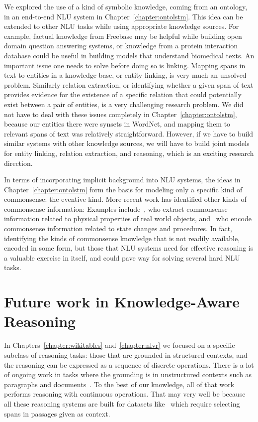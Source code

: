 We explored the use of a kind of symbolic knowledge, coming from an ontology, in
an end-to-end NLU system in Chapter~\ref{chapter:ontolstm}. This idea can be
extended to other NLU tasks while using appropriate knowledge sources.
For example, factual knowledge from Freebase may be helpful while building open
domain question answering systems, or knowledge from a protein interaction
database could be useful in building models that understand biomedical texts.
An important issue one needs to solve before doing so is linking. Mapping spans
in text to entities in a knowledge base, or entity linking, is very much an
unsolved problem. Similarly relation extraction, or identifying whether a given
span of text provides evidence for the existence of a specific relation that
could potentially exist between a pair of entities, is a very challenging
research problem. We did not have to deal with these issues completely in
Chapter~\ref{chapter:ontolstm}, because our entities there were synsets in
WordNet, and mapping them to relevant spans of text was relatively
straightforward. However, if we have to build similar systems with other
knowledge sources, we will have to build joint models for entity linking,
relation extraction, and reasoning, which is an exciting research direction.


In terms of incorporating implicit background into NLU systems, the ideas
in Chapter~\ref{chapter:ontolstm} form the basis for modeling only a specific
kind of commonsense: the eventive kind. More recent work has identified other
kinds of commonsense information: Examples include~\cite{forbes2017}, who
extract commonsense information related to physical properties of real world
objects, and~\cite{Tandon2018ReasoningAA} who encode commonsense information
related to state changes and procedures. In fact, identifying the kinds of
commonsense knowledge that is not readily available, encoded in some form, 
but those that NLU systems need for effective reasoning is a valuable exercise
in itself, and could pave way for solving several hard NLU tasks.

\section{Future work in Knowledge-Aware Reasoning}
In Chapters~\ref{chapter:wikitables} and~\ref{chapter:nlvr} we focused on a
specific subclass of reasoning tasks: those that are grounded in structured
contexts, and the reasoning can be expressed as a sequence of discrete
operations. There is a lot of ongoing work in tasks where the grounding is in
unstructured contexts such as paragraphs and
documents~\citep[among others]{hill2015goldilocks,Seo2016BidirectionalAF,dhingra2016gated,Xiong2016DynamicMN,yu2018qanet}.
To the best of our knowledge, all of that work performs reasoning with
continuous operations.
That may very well be because all these reasoning systems are built for datasets
like~\cite[among others]{Richardson2013MCTestAC,Rajpurkar2016SQuAD10,Joshi2017TriviaQAAL}
which require selecting spans in passages given as context.

